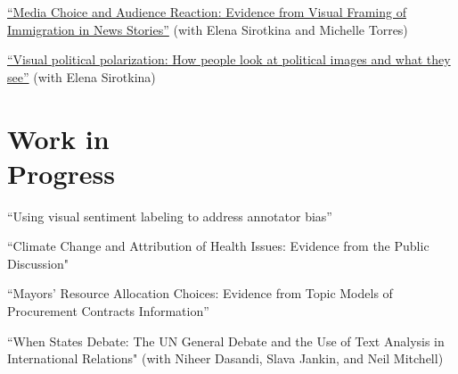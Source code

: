 \documentclass[margin,line,10.95pt]{res}
\begin{document}
\begin{resume}
\vspace*{-2.5mm}

\href{https://osf.io/4tfjx}{``Media Choice and Audience Reaction: Evidence from Visual Framing of Immigration in News Stories''} (with Elena Sirotkina and Michelle Torres)

\vspace*{-2.5mm}
\href{https://www.dropbox.com/s/25dtsp9ky1awc5g/Sirotkina_Gasparyan_VisPolarization.pdf?dl=0}{``Visual political polarization: How people look at political images and what they see''} (with Elena Sirotkina)


\section{\sc Work in \\ Progress}

``Using visual sentiment labeling to address annotator bias''  

 \vspace*{-3.5mm}
``Climate Change and Attribution of Health Issues: Evidence from the Public Discussion" 

\vspace*{-2.5mm}

``Mayors’ Resource Allocation Choices: Evidence from Topic Models of Procurement
Contracts Information''

\vspace*{-3.5mm}
``When States Debate: The UN General Debate and the Use of Text Analysis in International Relations" (with Niheer Dasandi, Slava Jankin, and Neil Mitchell)







\end{resume}
\end{document}
